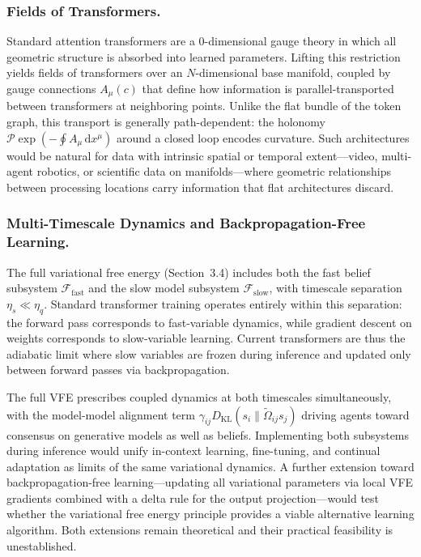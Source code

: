 \documentclass[twoside,11pt]{article}
\begin{document}
\subsubsection{Fields of Transformers.}

Standard attention transformers are a 0-dimensional gauge theory in which all geometric structure is absorbed into learned parameters. Lifting this restriction yields fields of transformers over an $N$-dimensional base manifold, coupled by gauge connections $A_\mu(c)$ that define how information is parallel-transported between transformers at neighboring points. Unlike the flat bundle of the token graph, this transport is generally path-dependent: the holonomy $\mathcal{P}\exp\!\left(-\oint A_\mu \, \mathrm{d}x^\mu\right)$ around a closed loop encodes curvature. Such architectures would be natural for data with intrinsic spatial or temporal extent---video, multi-agent robotics, or scientific data on manifolds---where geometric relationships between processing locations carry information that flat architectures discard.

\subsubsection{Multi-Timescale Dynamics and Backpropagation-Free Learning.}

The full variational free energy (Section~3.4) includes both the fast belief subsystem $\mathcal{F}_{\text{fast}}$ and the slow model subsystem $\mathcal{F}_{\text{slow}}$, with timescale separation $\eta_s \ll \eta_q$. Standard transformer training operates entirely within this separation: the forward pass corresponds to fast-variable dynamics, while gradient descent on weights corresponds to slow-variable learning. Current transformers are thus the adiabatic limit where slow variables are frozen during inference and updated only between forward passes via backpropagation.

The full VFE prescribes coupled dynamics at both timescales simultaneously, with the model-model alignment term $\gamma_{ij} D_{\mathrm{KL}}(s_i \| \tilde{\Omega}_{ij} s_j)$ driving agents toward consensus on generative models as well as beliefs. Implementing both subsystems during inference would unify in-context learning, fine-tuning, and continual adaptation as limits of the same variational dynamics. A further extension toward backpropagation-free learning---updating all variational parameters via local VFE gradients combined with a delta rule for the output projection---would test whether the variational free energy principle provides a viable alternative learning algorithm. Both extensions remain theoretical and their practical feasibility is unestablished.
\end{document}
